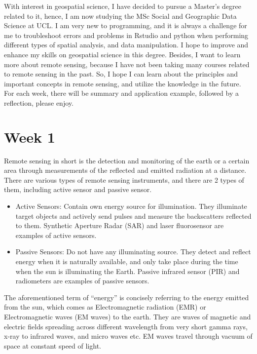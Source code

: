 \documentclass[
  letterpaper,
  DIV=11,
  numbers=noendperiod]{scrreprt}
\begin{document}
With interest in geospatial science, I have decided to pursue a Master's
degree related to it, hence, I am now studying the MSc Social and
Geographic Data Science at UCL. I am very new to programming, and it is
always a challenge for me to troubleshoot errors and problems in Rstudio
and python when performing different types of spatial analysis, and data
manipulation. I hope to improve and enhance my skills on geospatial
science in this degree. Besides, I want to learn more about remote
sensing, because I have not been taking many courses related to remote
sensing in the past. So, I hope I can learn about the principles and
important concepts in remote sensing, and utilize the knowledge in the
future. For each week, there will be summary and application example,
followed by a reflection, please enjoy.


\hypertarget{week-1}{%
\chapter{Week 1}\label{week-1}}

Remote sensing in short is the detection and monitoring of the earth or
a certain area through measurements of the reflected and emitted
radiation at a distance. There are various types of remote sensing
instruments, and there are 2 types of them, including active sensor and
passive sensor.

\begin{itemize}
\item
  Active Sensors: Contain own energy source for illumination. They
  illuminate target objects and actively send pulses and measure the
  backscatters reflected to them. Synthetic Aperture Radar (SAR) and
  laser fluorosensor are examples of active sensors.
\item
  Passive Sensors: Do not have any illuminating source. They detect and
  reflect energy when it is naturally available, and only take place
  during the time when the sun is illuminating the Earth. Passive
  infrared sensor (PIR) and radiometers are examples of passive sensors.
\end{itemize}

The aforementioned term of ``energy'' is concisely referring to the
energy emitted from the sun, which comes as Electromagnetic radiation
(EMR) or Electromagnetic waves (EM waves) to the earth. They are waves
of magnetic and electric fields spreading across different wavelength
from very short gamma rays, x-ray to infrared waves, and micro waves
etc. EM waves travel through vacuum of space at constant speed of light.
\end{document}
